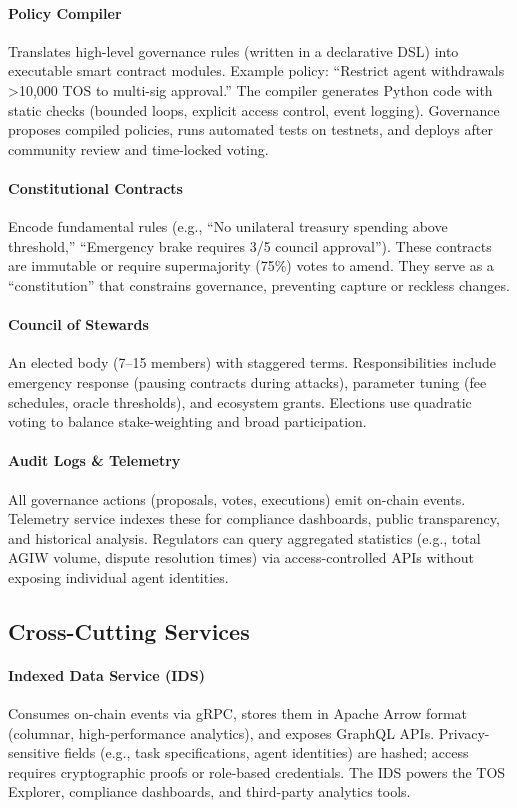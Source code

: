 \documentclass[11pt]{article}
\begin{document}
\paragraph{Policy Compiler} Translates high-level governance rules (written in a declarative DSL) into executable smart contract modules. Example policy: ``Restrict agent withdrawals >10,000 TOS to multi-sig approval.'' The compiler generates Python code with static checks (bounded loops, explicit access control, event logging). Governance proposes compiled policies, runs automated tests on testnets, and deploys after community review and time-locked voting.

\paragraph{Constitutional Contracts} Encode fundamental rules (e.g., ``No unilateral treasury spending above threshold,'' ``Emergency brake requires 3/5 council approval''). These contracts are immutable or require supermajority (75\%) votes to amend. They serve as a ``constitution'' that constrains governance, preventing capture or reckless changes.

\paragraph{Council of Stewards} An elected body (7--15 members) with staggered terms. Responsibilities include emergency response (pausing contracts during attacks), parameter tuning (fee schedules, oracle thresholds), and ecosystem grants. Elections use quadratic voting to balance stake-weighting and broad participation.

\paragraph{Audit Logs \& Telemetry} All governance actions (proposals, votes, executions) emit on-chain events. Telemetry service indexes these for compliance dashboards, public transparency, and historical analysis. Regulators can query aggregated statistics (e.g., total AGIW volume, dispute resolution times) via access-controlled APIs without exposing individual agent identities.

\subsection{Cross-Cutting Services}
\paragraph{Indexed Data Service (IDS)} Consumes on-chain events via gRPC, stores them in Apache Arrow format (columnar, high-performance analytics), and exposes GraphQL APIs. Privacy-sensitive fields (e.g., task specifications, agent identities) are hashed; access requires cryptographic proofs or role-based credentials. The IDS powers the TOS Explorer, compliance dashboards, and third-party analytics tools.
\end{document}
